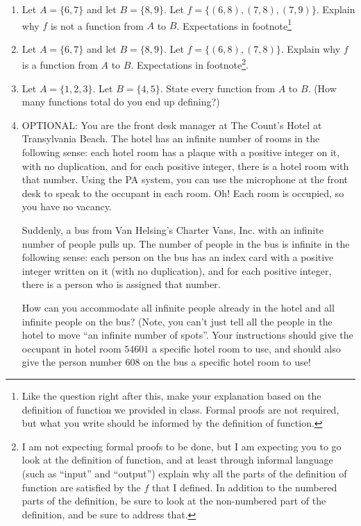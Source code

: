 \documentclass{article}
\begin{document}
\begin{enumerate}
\newpage

\item Let $A = \{6,7\}$ and let $B=\{8,9\}$. Let $f=\{(6,8),(7,8),(7,9)\}$. Explain why $f$ is not a function from $A$ to $B$. Expectations in footnote\footnote{Like the question right after this, make your explanation based on the definition of function we provided in class. Formal proofs are not required, but what you write should be informed by the definition of function.}

\newpage

\item Let $A = \{6,7\}$ and let $B=\{8,9\}$. Let $f=\{(6,8),(7,8)\}$. Explain why $f$ is a function from $A$ to $B$. Expectations in footnote\footnote{I am not expecting formal proofs to be done, but I am expecting you to go look at the definition of function, and at least through informal language (such as ``input'' and ``output'') explain why all the parts of the definition of function are satisfied by the $f$ that I defined. In addition to the numbered parts of the definition, be sure to look at the non-numbered part of the definition, and be sure to address that.}.

\newpage

\item Let $A = \{1,2,3\}$. Let $B = \{4,5\}$. State every function from $A$ to $B$. (How many functions total do you end up defining?)

\newpage

\item OPTIONAL: You are the front desk manager at The Count's Hotel at Transylvania Beach. The hotel has an infinite number of rooms in the following sense: each hotel room has a plaque with a positive integer on it, with no duplication, and for each positive integer, there is a hotel room with that number. Using the PA system, you can use the microphone at the front desk to speak to the occupant in each room. Oh! Each room is occupied, so you have no vacancy. 

Suddenly, a bus from Van Helsing's Charter Vans, Inc. with an infinite number of people pulls up. The number of people in the bus is infinite in the following sense: each person on the bus has an index card with a positive integer written on it (with no duplication), and for each positive integer, there is a person who is assigned that number.

How can you accommodate all infinite people already in the hotel and all infinite people on the bus? (Note, you can't just tell all the people in the hotel to move ``an infinite number of spots''. Your instructions should give the occupant in hotel room $54601$ a specific hotel room to use, and should also give the person number $608$ on the bus a specific hotel room to use!

\end{enumerate}
\end{document}
